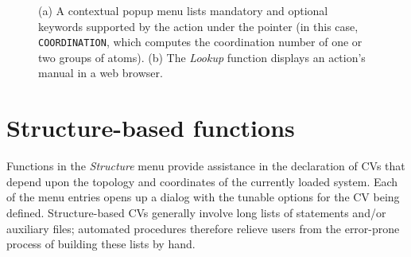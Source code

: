 \documentclass[preprint,12pt]{elsarticle}
\begin{document}
\begin{figure}
  \centering
  \caption{(a) A contextual popup menu lists mandatory and
    optional keywords supported by the action under the pointer (in
    this case, \texttt{COORDINATION}, which computes the coordination
    number of one or two groups of atoms). (b) The \emph{Lookup} function
    displays an action's manual in a web browser. }
  \label{fig:help}
\end{figure}





\section{Structure-based functions}


Functions in the \emph{Structure} menu provide assistance in the
declaration of CVs that depend upon the topology and coordinates of
the currently loaded system.  Each of the menu entries opens up a
dialog with the tunable options for the CV being defined. Structure-based CVs
generally involve long lists of statements and/or auxiliary files;
automated procedures therefore relieve users from the error-prone
process of building these lists by hand.
\end{document}
